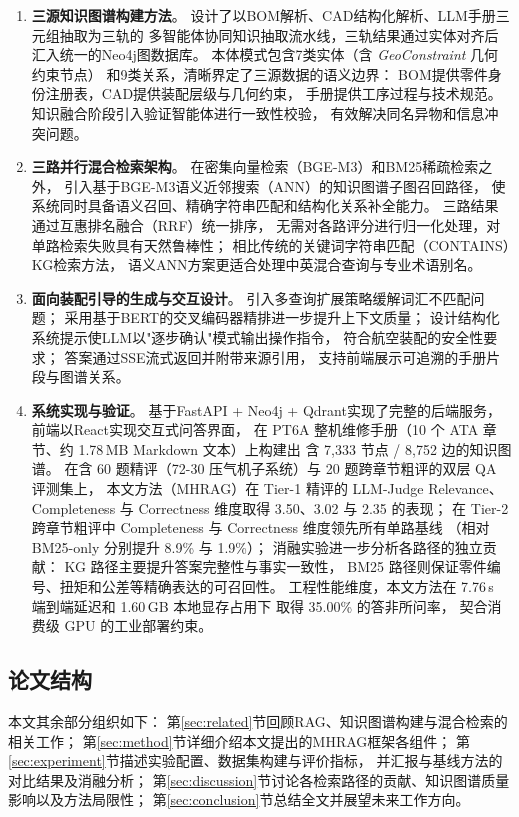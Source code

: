 \begin{enumerate}
  \item \textbf{三源知识图谱构建方法}。
        设计了以BOM解析、CAD结构化解析、LLM手册三元组抽取为三轨的
        多智能体协同知识抽取流水线，三轨结果通过实体对齐后
        汇入统一的Neo4j图数据库。
        本体模式包含7类实体（含 \textit{GeoConstraint} 几何约束节点）
        和9类关系，清晰界定了三源数据的语义边界：
        BOM提供零件身份注册表，CAD提供装配层级与几何约束，
        手册提供工序过程与技术规范。
        知识融合阶段引入验证智能体进行一致性校验，
        有效解决同名异物和信息冲突问题。

  \item \textbf{三路并行混合检索架构}。
        在密集向量检索（BGE-M3）和BM25稀疏检索之外，
        引入基于BGE-M3语义近邻搜索（ANN）的知识图谱子图召回路径，
        使系统同时具备语义召回、精确字符串匹配和结构化关系补全能力。
        三路结果通过互惠排名融合（RRF）统一排序，
        无需对各路评分进行归一化处理，对单路检索失败具有天然鲁棒性；
        相比传统的关键词字符串匹配（CONTAINS）KG检索方法，
        语义ANN方案更适合处理中英混合查询与专业术语别名。

  \item \textbf{面向装配引导的生成与交互设计}。
        引入多查询扩展策略缓解词汇不匹配问题；
        采用基于BERT的交叉编码器精排进一步提升上下文质量；
        设计结构化系统提示使LLM以"逐步确认"模式输出操作指令，
        符合航空装配的安全性要求；
        答案通过SSE流式返回并附带来源引用，
        支持前端展示可追溯的手册片段与图谱关系。

  \item \textbf{系统实现与验证}。
        基于FastAPI + Neo4j + Qdrant实现了完整的后端服务，
        前端以React实现交互式问答界面，
        在 PT6A 整机维修手册（10 个 ATA 章节、约 1.78\,MB Markdown 文本）上构建出
        含 7{,}333 节点 / 8{,}752 边的知识图谱。
        在含 60 题精评（72-30 压气机子系统）与 20 题跨章节粗评的双层 QA 评测集上，
        本文方法（MHRAG）在 Tier-1 精评的 LLM-Judge Relevance、Completeness 与
        Correctness 维度取得 3.50、3.02 与 2.35 的表现；
        在 Tier-2 跨章节粗评中 Completeness 与 Correctness 维度领先所有单路基线
        （相对 BM25-only 分别提升 8.9\% 与 1.9\%）；
        消融实验进一步分析各路径的独立贡献：
        KG 路径主要提升答案完整性与事实一致性，
        BM25 路径则保证零件编号、扭矩和公差等精确表达的可召回性。
        工程性能维度，本文方法在 7.76\,s 端到端延迟和 1.60\,GB 本地显存占用下
        取得 35.00\% 的答非所问率，
        契合消费级 GPU 的工业部署约束。
\end{enumerate}

\subsection{论文结构}
\label{sec:structure}

本文其余部分组织如下：
第\ref{sec:related}节回顾RAG、知识图谱构建与混合检索的相关工作；
第\ref{sec:method}节详细介绍本文提出的MHRAG框架各组件；
第\ref{sec:experiment}节描述实验配置、数据集构建与评价指标，
并汇报与基线方法的对比结果及消融分析；
第\ref{sec:discussion}节讨论各检索路径的贡献、知识图谱质量影响以及方法局限性；
第\ref{sec:conclusion}节总结全文并展望未来工作方向。

